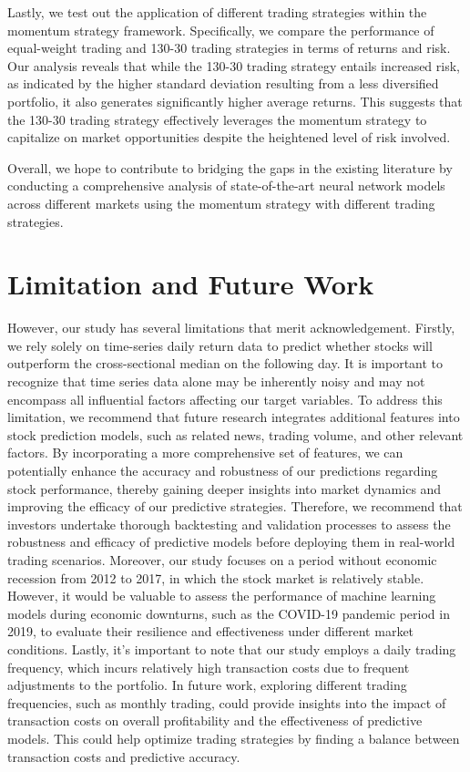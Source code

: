 \documentclass{article}
\begin{document}
Lastly, we test out the application of different trading strategies within the momentum strategy framework. Specifically, we compare the performance of equal-weight trading and 130-30 trading strategies in terms of returns and risk. Our analysis reveals that while the 130-30 trading strategy entails increased risk, as indicated by the higher standard deviation resulting from a less diversified portfolio, it also generates significantly higher average returns. This suggests that the 130-30 trading strategy effectively leverages the momentum strategy to capitalize on market opportunities despite the heightened level of risk involved.

Overall, we hope to contribute to bridging the gaps in the existing literature by conducting a comprehensive analysis of state-of-the-art neural network models across different markets using the momentum strategy with different trading strategies.

\section{Limitation and Future Work}
\label{limitation}
However, our study has several limitations that merit acknowledgement. Firstly, we rely solely on time-series daily return data to predict whether stocks will outperform the cross-sectional median on the following day. It is important to recognize that time series data alone may be inherently noisy and may not encompass all influential factors affecting our target variables. To address this limitation, we recommend that future research integrates additional features into stock prediction models, such as related news, trading volume, and other relevant factors. By incorporating a more comprehensive set of features, we can potentially enhance the accuracy and robustness of our predictions regarding stock performance, thereby gaining deeper insights into market dynamics and improving the efficacy of our predictive strategies. Therefore, we recommend that investors undertake thorough backtesting and validation processes to assess the robustness and efficacy of predictive models before deploying them in real-world trading scenarios. Moreover, our study focuses on a period without economic recession from 2012 to 2017, in which the stock market is relatively stable. However, it would be valuable to assess the performance of machine learning models during economic downturns, such as the COVID-19 pandemic period in 2019, to evaluate their resilience and effectiveness under different market conditions. Lastly, it's important to note that our study employs a daily trading frequency, which incurs relatively high transaction costs due to frequent adjustments to the portfolio. In future work, exploring different trading frequencies, such as monthly trading, could provide insights into the impact of transaction costs on overall profitability and the effectiveness of predictive models. This could help optimize trading strategies by finding a balance between transaction costs and predictive accuracy.
\end{document}
